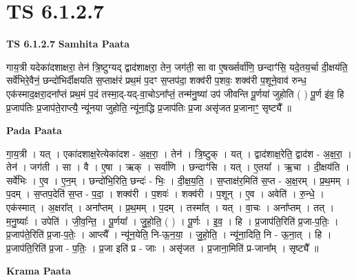 \documentclass[17pt]{extarticle}
\begin{document}
\section{ TS 6.1.2.7 }

\textbf{TS 6.1.2.7 } \newline
\textbf{Samhita Paata} \newline

गाय॒त्री यदेका॑दशाक्षरा॒ तेन॑ त्रि॒ष्टुग्यद् द्वाद॑शाक्षरा॒ तेन॒ जग॑ती॒ सा वा ए॒षर्ख्सर्वा॑णि॒ छन्दाꣳ॑सि॒ यदे॒तय॒र्चा दी॒क्षय॑ति॒ सर्वे॑भिरे॒वैनं॒ छन्दो॑भिर्दीक्षयति स॒प्ताक्ष॑रं प्रथ॒मं प॒दꣳ स॒प्तप॑दा॒ शक्व॑री प॒शवः॒ शक्व॑री प॒शूने॒वाव॑ रुन्ध॒ एक॑स्माद॒क्षरा॒दना᳚प्तं प्रथ॒मं प॒दं तस्मा॒द्-यद्-वा॒चोऽना᳚प्तं॒ तन्म॑नु॒ष्या॑ उप॑ जीवन्ति पू॒र्णया॑ जुहोति ( ) पू॒र्ण इ॑व॒ हि प्र॒जाप॑तिः प्र॒जाप॑ते॒राप्त्यै॒ न्यू॑नया जुहोति॒ न्यू॑ना॒द्धि प्र॒जाप॑तिः प्र॒जा असृ॑जत प्र॒जानाꣳ॒॒ सृष्ट्यै᳚ ॥ \newline

\textbf{Pada Paata} \newline

गा॒य॒त्री । यत् । एका॑दशाक्ष॒रेत्येका॑दश - अ॒क्ष॒रा॒ । तेन॑ । त्रि॒ष्टुक् । यत् । द्वाद॑शाक्ष॒रेति॒ द्वाद॑श - अ॒क्ष॒रा॒ । तेन॑ । जग॑ती । सा । वै । ए॒षा । ऋक् । सर्वा॑णि । छन्दाꣳ॑सि । यत् । ए॒तया᳚ । ऋ॒चा । दी॒क्षय॑ति । सर्वे॑भिः । ए॒व । ए॒न॒म् । छन्दो॑भि॒रिति॒ छन्दः॑ - भिः॒ । दी॒क्ष॒य॒ति॒ । स॒प्ताक्ष॑र॒मिति॑ स॒प्त - अ॒क्ष॒रम् । प्र॒थ॒मम् । प॒दम् । स॒प्तप॒देति॑ स॒प्त - प॒दा॒ । शक्व॑री । प॒शवः॑ । शक्व॑री । प॒शून् । ए॒व । अवेति॑ । रु॒न्धे॒ । एक॑स्मात् । अ॒क्षरा᳚त् । अना᳚प्तम् । प्र॒थ॒मम् । प॒दम् । तस्मा᳚त् । यत् । वा॒चः । अना᳚प्तम् । तत् । म॒नु॒ष्याः᳚ । उपेति॑ । जी॒व॒न्ति॒ । पू॒र्णया᳚ । जु॒हो॒ति॒ ( ) । पू॒र्णः । इ॒व॒ । हि । प्र॒जाप॑ति॒रिति॑ प्र॒जा-प॒तिः॒ । प्र॒जाप॑ते॒रिति॑ प्र॒जा-प॒तेः॒ । आप्त्यै᳚ । न्यू॑न॒येति॒ नि-ऊ॒न॒या॒ । जु॒हो॒ति॒ । न्यू॑ना॒दिति॒ नि - ऊ॒ना॒त् । हि । प्र॒जाप॑ति॒रिति॑ प्र॒जा - प॒तिः॒ । प्र॒जा इति॑ प्र - जाः । असृ॑जत । प्र॒जाना॒मिति॑ प्र-जाना᳚म् । सृष्ट्यै᳚ ॥  \newline


\textbf{Krama Paata} \newline
\end{document}
